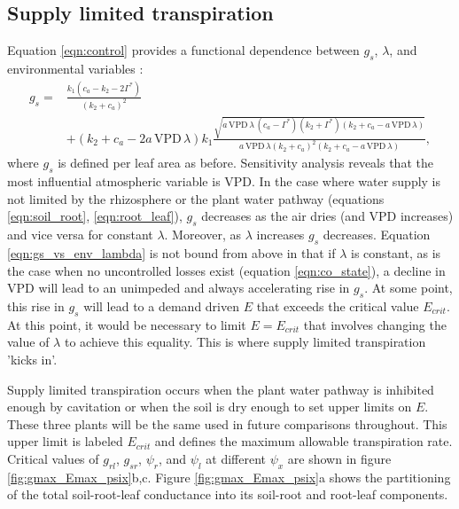 \documentclass[utf8]{frontiersSCNS} %
\begin{document}
\subsection{Supply limited transpiration}

Equation \ref{eqn:control} provides a functional dependence between $g_s$, $\lambda$, and environmental variables \citep{katul_stomatal_2009}:
\begin{equation}
    \label{eqn:gs_vs_env_lambda}
    \begin{split}
        g_s = & \frac{k_1 (c_a - k_2 - 2 \Gamma^*)}{(k_2+c_a)^2} \\
        & + (k_2+c_a-2 a\, \text{VPD}\, \lambda) k_1 \frac{\sqrt{a\, \text{VPD}\, \lambda\, (c_a-\Gamma^*)(k_2+\Gamma^*)(k_2+c_a-a\, \text{VPD}\, \lambda)}}{a\, \text{VPD}\, \lambda (k_2 +c_a)^2(k_2 +c_a-a\, \text{VPD}\, \lambda)} ,
    \end{split}
\end{equation}
where $g_s$ is defined per leaf area as before. Sensitivity analysis reveals that the most influential atmospheric variable is VPD. In the case where water supply is not limited by the rhizosphere or the plant water pathway (equations \ref{eqn:soil_root}, \ref{eqn:root_leaf}), $g_s$ decreases as the air dries (and VPD increases) and vice versa for constant $\lambda$. Moreover, as $\lambda$ increases $g_s$ decreases. Equation \ref{eqn:gs_vs_env_lambda} is not bound from above in that if $\lambda$ is constant, as is the case when no uncontrolled losses exist (equation \ref{eqn:co_state}), a decline in VPD will lead to an unimpeded and always accelerating rise in $g_s$. At some point, this rise in $g_s$ will lead to a demand driven $E$ that exceeds the critical value $E_{crit}$. At this point, it would be necessary to limit $E = E_{crit}$ that involves changing the value of $\lambda$ to achieve this equality. This is where supply limited transpiration 'kicks in'.

Supply limited transpiration occurs when the plant water pathway is inhibited enough by cavitation or when the soil is dry enough to set upper limits on $E$.  These three plants will be the same used in future comparisons throughout. This upper limit is labeled $E_{crit}$ and defines the maximum allowable transpiration rate. Critical values of $g_{rl}$, $g_{sr}$, $\psi_r$, and $\psi_l$ at different $\psi_x$ are shown in figure \ref{fig:gmax_Emax_psix}b,c. Figure \ref{fig:gmax_Emax_psix}a shows the partitioning of the total soil-root-leaf conductance into its soil-root and root-leaf components. 
\end{document}
